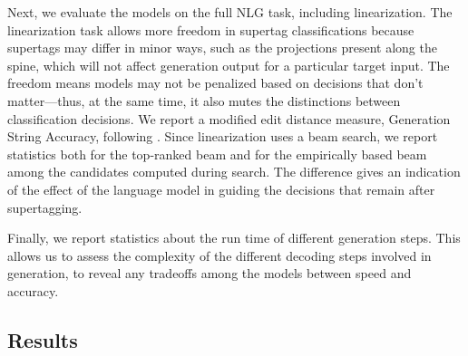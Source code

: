 \documentclass[11pt]{article}
\begin{document}
Next, we evaluate the models on the full NLG task, including
linearization.  
%
The linearization task allows more freedom in supertag
classifications because supertags may differ in minor ways, such as
the projections present along the spine, which will not affect
generation output for a particular target input.
%
The freedom means models may not be penalized based on decisions that
don't matter---thus, at the same time, it also mutes the
distinctions between classification decisions.
%
We report a modified edit distance measure, Generation String Accuracy, following \cite{bangalore2000evaluation}.
%
%
Since linearization uses a beam search, we report statistics both for
the top-ranked beam and for the empirically based beam among the
candidates computed during search.
%
The difference gives an indication of the effect of the language model
in guiding the decisions that remain after supertagging.

Finally, we report statistics about the run time of different
generation steps.
%
This allows us to assess the complexity of the different decoding
steps involved in generation, to reveal any tradeoffs among the models
between speed and accuracy.

\subsection{Results}
\label{sec:results}
\end{document}
